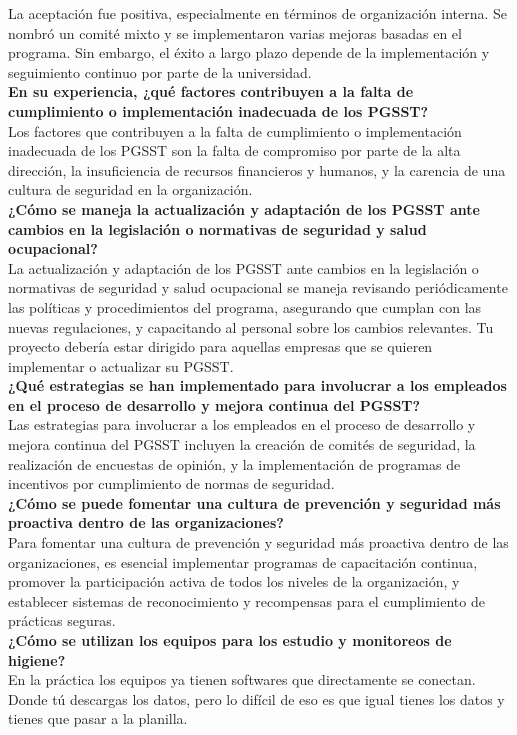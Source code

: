 La aceptación fue positiva, especialmente en términos de organización interna. Se nombró un comité mixto y se implementaron varias mejoras basadas en el programa. Sin embargo, el éxito a largo plazo depende de la implementación y seguimiento continuo por parte de la universidad.
\\
\noindent
\textbf{En su experiencia, ¿qué factores contribuyen a la falta de cumplimiento o implementación inadecuada de los PGSST?}\\
Los factores que contribuyen a la falta de cumplimiento o implementación inadecuada de los PGSST son la falta de compromiso por parte de la alta dirección, la insuficiencia de recursos financieros y humanos, y la carencia de una cultura de seguridad en la organización.
\\
\noindent
\textbf{¿Cómo se maneja la actualización y adaptación de los PGSST ante cambios en la legislación o normativas de seguridad y salud ocupacional?}\\
La actualización y adaptación de los PGSST ante cambios en la legislación o normativas de seguridad y salud ocupacional se maneja revisando periódicamente las políticas y procedimientos del programa, asegurando que cumplan con las nuevas regulaciones, y capacitando al personal sobre los cambios relevantes. Tu proyecto debería estar dirigido para aquellas empresas que se quieren implementar o actualizar su PGSST.
\\
\noindent
\textbf{¿Qué estrategias se han implementado para involucrar a los empleados en el proceso de desarrollo y mejora continua del PGSST?}\\
Las estrategias para involucrar a los empleados en el proceso de desarrollo y mejora continua del PGSST incluyen la creación de comités de seguridad, la realización de encuestas de opinión, y la implementación de programas de incentivos por cumplimiento de normas de seguridad.
\\
\noindent
\textbf{¿Cómo se puede fomentar una cultura de prevención y seguridad más proactiva dentro de las organizaciones?}\\
Para fomentar una cultura de prevención y seguridad más proactiva dentro de las organizaciones, es esencial implementar programas de capacitación continua, promover la participación activa de todos los niveles de la organización, y establecer sistemas de reconocimiento y recompensas para el cumplimiento de prácticas seguras.
\\
\noindent
\textbf{¿Cómo se utilizan los equipos para los estudio y monitoreos de higiene?}\\
En la práctica los equipos ya tienen softwares que directamente se conectan. Donde tú descargas los datos, pero lo difícil de eso es que igual tienes los datos y tienes que pasar a la planilla.

